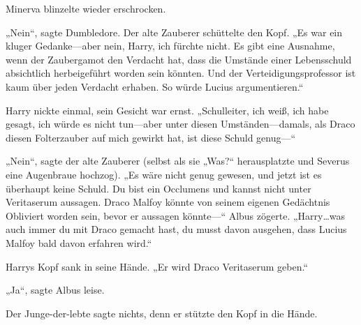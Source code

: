 Minerva blinzelte wieder erschrocken.

„Nein“, sagte Dumbledore. Der alte Zauberer schüttelte den Kopf. „Es war ein kluger Gedanke—aber nein, Harry, ich fürchte nicht. Es gibt eine Ausnahme, wenn der Zaubergamot den Verdacht hat, dass die Umstände einer Lebensschuld absichtlich herbeigeführt worden sein könnten. Und der Verteidigungsprofessor ist kaum über jeden Verdacht erhaben. So würde Lucius argumentieren.“

Harry nickte einmal, sein Gesicht war ernst. „Schulleiter, ich weiß, ich habe gesagt, ich würde es nicht tun—aber unter diesen Umständen—damals, als Draco diesen Folterzauber auf mich gewirkt hat, ist diese Schuld genug—“

„Nein“, sagte der alte Zauberer (selbst als sie „Was?“ herausplatzte und Severus eine Augenbraue hochzog). „Es wäre nicht genug gewesen, und jetzt ist es überhaupt keine Schuld. Du bist ein Occlumens und kannst nicht unter Veritaserum aussagen. Draco Malfoy könnte von seinem eigenen Gedächtnis Obliviert worden sein, bevor er aussagen könnte—“ Albus zögerte. „Harry…was auch immer du mit Draco gemacht hast, du musst davon ausgehen, dass Lucius Malfoy bald davon erfahren wird.“

Harrys Kopf sank in seine Hände. „Er wird Draco Veritaserum geben.“

„Ja“, sagte Albus leise.

Der Junge-der-lebte sagte nichts, denn er stützte den Kopf in die Hände.

